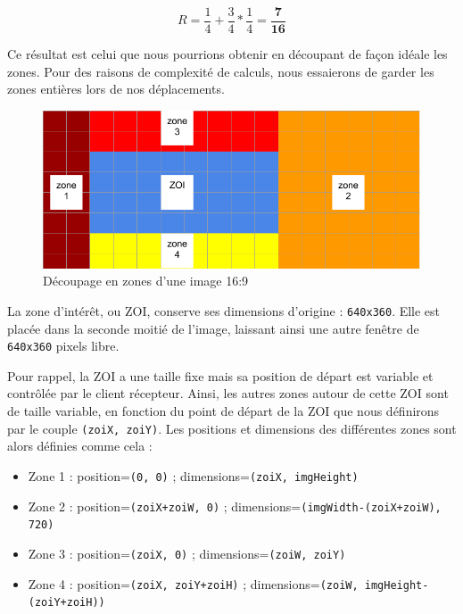\documentclass[11pt,a4paper]{article}
\begin{document}
$$ R = \frac{1}{4} + \frac{3}{4}*\frac{1}{4} = \mathbf{\frac{7}{16}} $$

\bigbreak

Ce résultat est celui que nous pourrions obtenir en découpant de façon idéale les zones.
Pour des raisons de complexité de calculs, nous essaierons de garder les zones entières lors de nos déplacements.

\begin{figure}[H]
\begin{center}
\includegraphics[scale=0.4]{images/decoupage.png}
\end{center}
\caption{Découpage en zones d'une image 16:9}
\label{}
\end{figure}

\bigbreak
La zone d'intérêt, ou ZOI, conserve ses dimensions d'origine : \texttt{640x360}.
Elle est placée dans la seconde moitié de l'image, laissant ainsi une autre fenêtre de \texttt{640x360} pixels libre.

\bigbreak
Pour rappel, la ZOI a une taille fixe mais sa position de départ est variable et contrôlée par le client récepteur.
Ainsi, les autres zones autour de cette ZOI sont de taille variable, en fonction du point de départ de la ZOI que nous définirons par le couple \texttt{(zoiX, zoiY)}.
Les positions et dimensions des différentes zones sont alors définies comme cela :
\bigbreak
\begin{itemize}
\item{Zone 1 : position=\texttt{(0, 0)} ; dimensions=\texttt{(zoiX, imgHeight)}}
\item{Zone 2 : position=\texttt{(zoiX+zoiW, 0)} ; dimensions=\texttt{(imgWidth-(zoiX+zoiW), 720)}}
\item{Zone 3 : position=\texttt{(zoiX, 0)} ; dimensions=\texttt{(zoiW, zoiY)}}
\item{Zone 4 : position=\texttt{(zoiX, zoiY+zoiH)} ; dimensions=\texttt{(zoiW, imgHeight-(zoiY+zoiH))}}
\end{itemize}
\end{document}
